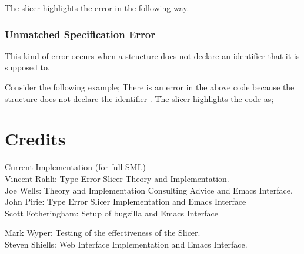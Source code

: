 \documentclass{report}
\begin{document}
\begin{itemize}
The slicer highlights the error in the following way.


\newpage


\subsubsection{Unmatched Specification Error}

\subitem This kind of error occurs when a structure does not declare
an identifier that it is supposed to.

Consider the following example;
There is an error in the above code because the structure
 does not declare the identifier .
The slicer highlights the code as;

\end{itemize}

\section {Credits}
Current Implementation (for full SML)\\

	Vincent Rahli: Type Error Slicer Theory and Implementation.\\

	Joe Wells: Theory and Implementation Consulting Advice and Emacs
   		   Interface.\\

	John Pirie: Type Error Slicer Implementation and Emacs Interface\\

        Scott Fotheringham: Setup of bugzilla and Emacs Interface

        Mark Wyper: Testing of the effectiveness of the Slicer.\\

	Steven Shiells: Web Interface Implementation and Emacs Interface.\\
\end{document}
